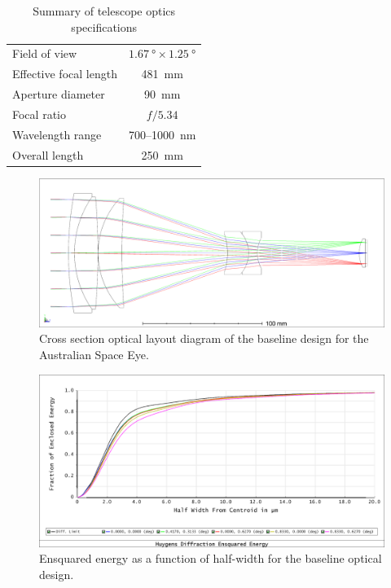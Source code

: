 \documentclass[]{iac}
\begin{document}
\begin{table}[p]
  \caption{Summary of telescope optics specifications}
  \label{tab:optics}
  \begin{center}
    \begin{tabular}{lc}
      \toprule \rule[-1ex]{0pt}{3.5ex} Field of view &  $\SI{1.67}{\degree} \times \SI{1.25}{\degree}$ \\
      \rule[-1ex]{0pt}{3.5ex} Effective focal length & \SI{481}{\milli\metre} \\
      \rule[-1ex]{0pt}{3.5ex} Aperture diameter & \SI{90}{\milli\metre} \\
      \rule[-1ex]{0pt}{3.5ex} Focal ratio & $f/5.34$ \\
      \rule[-1ex]{0pt}{3.5ex} Wavelength range & 700--\SI{1000}{\nano\metre} \\
      \rule[-1ex]{0pt}{3.5ex}  Overall length & \SI{250}{\milli\metre} \\
      \bottomrule
    \end{tabular}
  \end{center}
\end{table}

\begin{figure}[p]
  \center \includegraphics[width=\columnwidth]{figures/spie-layout.png}
  \caption{\label{fig:optics}Cross section optical layout diagram of the baseline design for the Australian Space Eye.}
\end{figure}

\begin{figure}[p]
  \center \includegraphics[width=\columnwidth]{figures/ensquared.png}
  \caption{\label{fig:ensquared}Ensquared energy as a function of half-width for the baseline optical design.}
\end{figure}
\end{document}

